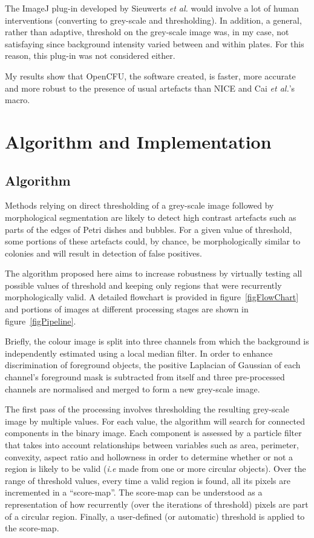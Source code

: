 \documentclass[10pt]{article}
\begin{document}
The ImageJ plug-in developed by Sieuwerts \emph{et al.} \cite{sieuwerts_simple_2008} would involve a lot of human
interventions (converting to grey-scale and thresholding).
In addition, a general, rather than adaptive, threshold on the grey-scale image was, in my case, 
not satisfaying since background intensity varied between and within plates.
For this reason, this plug-in was not considered either.

My results show that OpenCFU, the software created, is faster, more accurate and
more robust to the presence of usual artefacts than NICE and Cai \emph{et al.}'s macro.


\section*{Algorithm and Implementation}

\subsection*{Algorithm} 
Methods relying on direct thresholding of a grey-scale image followed
by morphological segmentation are likely to detect high contrast artefacts such
as parts of the edges of Petri dishes and bubbles.  For a given value of threshold,
some portions of these artefacts could, by chance, be morphologically similar to colonies and will result in
detection of false positives.

The algorithm proposed here aims to increase robustness by virtually testing
all possible values of threshold and keeping only regions that were recurrently morphologically
valid. A detailed flowchart is provided in figure~\ref{figFlowChart} and portions of images 
at different processing stages are shown in figure~\ref{figPipeline}.

Briefly, the colour image is split into three channels from which the background
is independently estimated using a local median filter.
In order to enhance discrimination of foreground objects,  the positive
Laplacian of Gaussian of each channel's foreground mask is subtracted from
itself and three pre-processed channels are normalised and merged to form a
new grey-scale image.

The first pass of the processing involves thresholding the resulting grey-scale
image by multiple values.
For each value, the algorithm will search for connected components in the binary
image.
Each component is assessed by a particle filter that takes into account relationships
between variables such as area, perimeter, convexity, aspect ratio and
hollowness in order to determine whether or not a region is likely to be valid 
(\emph{i.e} made from one or more circular objects).
Over the range of threshold values, every time a valid region is found, all
its pixels are incremented in a ``score-map''.
The score-map can be understood as a representation of how recurrently (over the
iterations of threshold) pixels are part of a circular region. Finally,  a
user-defined (or automatic) threshold is applied to the score-map.
 
\end{document}
